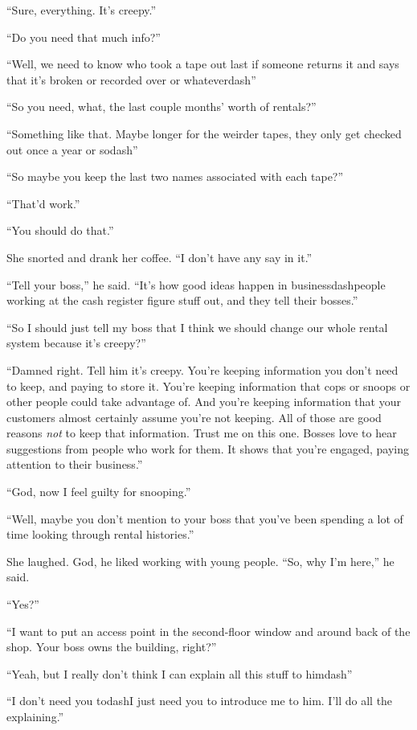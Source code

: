 ``Sure, everything.  It's creepy.''

``Do you need that much info?''

``Well, we need to know who took a tape out last if someone returns it
and says that it's broken or recorded over or whateverdash{}''

``So you need, what, the last couple months' worth of rentals?''

``Something like that.  Maybe longer for the weirder tapes, they only
get checked out once a year or sodash{}''

``So maybe you keep the last two names associated with each tape?''

``That'd work.''

``You should do that.''

She snorted and drank her coffee.  ``I don't have any say in it.''

``Tell your boss,'' he said.  ``It's how good ideas happen in
businessdash{}people working at the cash register figure stuff out, and
they tell their bosses.''

``So I should just tell my boss that I think we should change our
whole rental system because it's creepy?''

``Damned right.  Tell him it's creepy.  You're keeping information you
don't need to keep, and paying to store it.  You're keeping
information that cops or snoops or other people could take advantage
of.  And you're keeping information that your customers almost
certainly assume you're not keeping.  All of those are good reasons
\textit{not} to keep that information.  Trust me on this one.  Bosses
love to hear suggestions from people who work for them.  It shows that
you're engaged, paying attention to their business.''

``God, now I feel guilty for snooping.''

``Well, maybe you don't mention to your boss that you've been spending
a lot of time looking through rental histories.''

She laughed.  God, he liked working with young people.  ``So, why I'm
here,'' he said.

``Yes?''

``I want to put an access point in the second-floor window and around
back of the shop.  Your boss owns the building, right?''

``Yeah, but I really don't think I can explain all this stuff to
himdash{}''

``I don't need you todash{}I just need you to introduce me to him.  I'll
do all the explaining.''

